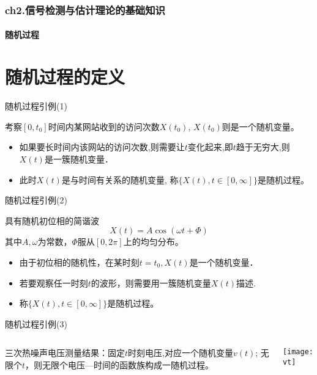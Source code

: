 \begin{frame}[shrink]
\frametitle{ch2.信号检测与估计理论的基础知识}
\framesubtitle{随机过程}
\tableofcontents[hideallsubsections]
\end{frame}

\section{随机过程的定义}

\begin{frame}{随机过程引例(1)}
\begin{example}
	考察$[0,t_0]$时间内某网站收到的访问次数$X(t_0)$, $X(t_0)$则是一个随机变量。
	\begin{itemize}
		\item 如果要长时间内该网站的访问次数,则需要让$t$变化起来,即$t$趋于无穷大,则$X(t)$是一簇随机变量．
		\item 此时$X(t)$是与时间有关系的随机变量, 称$\{X(t),t\in[0,\infty]\}$是随机过程。
	\end{itemize}	
\end{example}
\end{frame}

\begin{frame}{随机过程引例(2)}
\begin{example}
	具有随机初位相的简谐波
	\[X(t)=A\cos(\omega t+\Phi)\]
	其中$A,\omega$为常数，$\Phi$服从$[0,2\pi]$上的均匀分布。
	\begin{itemize}
		\item 由于初位相的随机性，在某时刻$t=t_0,X(t)$是一个随机变量．
		\item 若要观察任一时刻$t$的波形，则需要用一簇随机变量$X(t)$描述. 
		\item 称$\{X(t),t\in[0,\infty]\}$是随机过程。
	\end{itemize}	
\end{example}
\end{frame}

\begin{frame}{随机过程引例(3)}
\begin{columns}
	\begin{example}
		三次热噪声电压测量结果：固定$t$时刻电压,对应一个随机变量$v(t)$; 无限个$t$，则无限个电压---时间的函数族构成一随机过程。
	\end{example}
	\texttt{[image: vt]}
\end{columns}
\end{frame}

